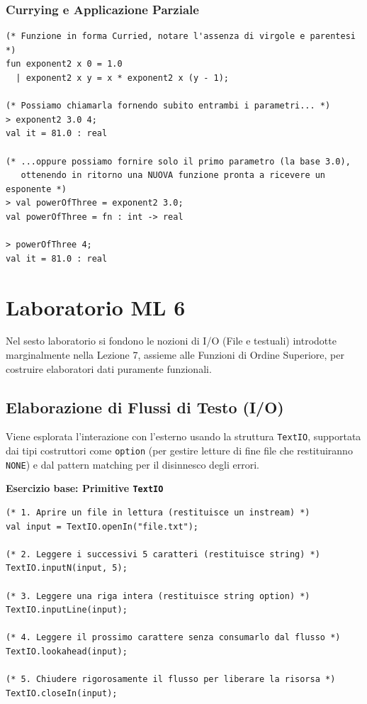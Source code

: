 \documentclass[12pt, a4paper]{article}
\begin{document}
\newpage

\subsubsection{Currying e Applicazione Parziale}
\begin{verbatim}
(* Funzione in forma Curried, notare l'assenza di virgole e parentesi *)
fun exponent2 x 0 = 1.0
  | exponent2 x y = x * exponent2 x (y - 1);

(* Possiamo chiamarla fornendo subito entrambi i parametri... *)
> exponent2 3.0 4;
val it = 81.0 : real

(* ...oppure possiamo fornire solo il primo parametro (la base 3.0),
   ottenendo in ritorno una NUOVA funzione pronta a ricevere un esponente *)
> val powerOfThree = exponent2 3.0;
val powerOfThree = fn : int -> real

> powerOfThree 4;
val it = 81.0 : real
\end{verbatim}


\section{Laboratorio ML 6}

Nel sesto laboratorio si fondono le nozioni di I/O (File e testuali) introdotte marginalmente nella Lezione 7, assieme alle Funzioni di Ordine Superiore, per costruire elaboratori dati puramente funzionali.

\subsection{Elaborazione di Flussi di Testo (I/O)}
Viene esplorata l'interazione con l'esterno usando la struttura \texttt{TextIO}, supportata dai tipi costruttori come \texttt{option} (per gestire letture di fine file che restituiranno \texttt{NONE}) e dal pattern matching per il disinnesco degli errori.

\textbf{Esercizio base: Primitive \texttt{TextIO}}
\begin{verbatim}
(* 1. Aprire un file in lettura (restituisce un instream) *)
val input = TextIO.openIn("file.txt");

(* 2. Leggere i successivi 5 caratteri (restituisce string) *)
TextIO.inputN(input, 5);

(* 3. Leggere una riga intera (restituisce string option) *)
TextIO.inputLine(input); 

(* 4. Leggere il prossimo carattere senza consumarlo dal flusso *)
TextIO.lookahead(input);

(* 5. Chiudere rigorosamente il flusso per liberare la risorsa *)
TextIO.closeIn(input);
\end{verbatim}
\end{document}
